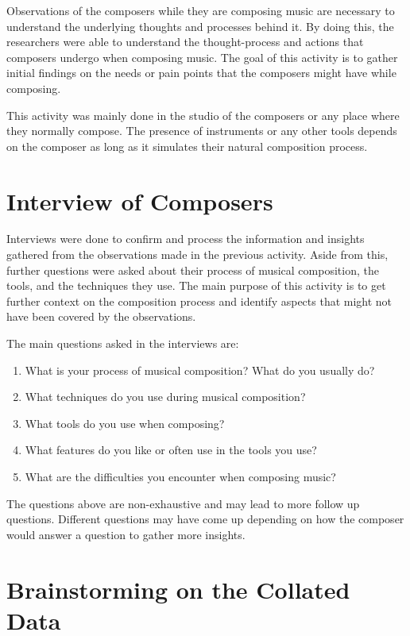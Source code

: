 		Observations of the composers while they are composing music are necessary to understand the underlying thoughts and processes behind it. By doing this, the researchers were able to understand the thought-process and actions that composers undergo when composing music. The goal of this activity is to gather initial findings on the needs or pain points that the composers might have while composing. 

		This activity was mainly done in the studio of the composers or any place where they normally compose. The presence of instruments or any other tools depends on the composer as long as it simulates their natural composition process. 

	\section{Interview of Composers}

		Interviews were done to confirm and process the information and insights gathered from the observations made in the previous activity. Aside from this, further questions were asked about their process of musical composition, the tools, and the techniques they use. The main purpose of this activity is to get further context on the composition process and identify aspects that might not have been covered by the observations. 

		The main questions asked in the interviews are: 
		\begin{enumerate}
			\item What is your process of musical composition? What do you usually do?
			\item What techniques do you use during musical composition?
			\item What tools do you use when composing?
			\item What features do you like or often use in the tools you use?
			\item What are the difficulties you encounter when composing music? 
		\end{enumerate}

		The questions above are non-exhaustive and may lead to more follow up questions. Different questions may have come up depending on how the composer would answer a question to gather more insights. 

	\section{Brainstorming on the Collated Data}

